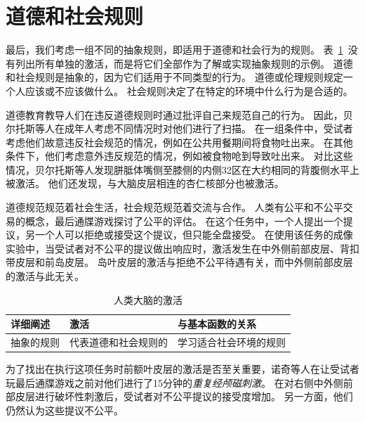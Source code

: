 \section{道德和社会规则}

最后，我们考虑一组不同的抽象规则，即适用于道德和社会行为的规则。
表~\ref{tab:9_9}~没有列出所有单独的激活，而是将它们全部作为了解或实现抽象规则的示例。
道德和社会规则是抽象的，因为它们适用于不同类型的行为。
道德或伦理规则规定一个人应该或不应该做什么。
社会规则决定了在特定的环境中什么行为是合适的。


道德教育教导人们在违反道德规则时通过批评自己来规范自己的行为\cite{locke1997self}。
因此，贝尔托斯等人\cite{berthoz2006affective}在成年人考虑不同情况时对他们进行了扫描。
在一组条件中，受试者考虑他们故意违反社会规范的情况，例如在公共用餐期间将食物吐出来。
在其他条件下，他们考虑意外违反规范的情况，例如被食物呛到导致吐出来。
对比这些情况，贝尔托斯等人发现胼胝体嘴侧至膝侧的内侧32区在大约相同的背腹侧水平上被激活。
他们还发现，与大脑皮层相连的杏仁核部分也被激活\cite{beckmann2009connectivity}。


道德规范规范着社会生活，社会规范规范着交流与合作。
人类有公平和不公平交易的概念，最后通牒游戏探讨了公平的评估。
在这个任务中，一个人提出一个提议，另一个人可以拒绝或接受这个提议，但只能全盘接受。
在使用该任务的成像实验中，当受试者对不公平的提议做出响应时，激活发生在中外侧前部皮层、背扣带皮层和前岛皮层\cite{sanfey2003neural}。
岛叶皮层的激活与拒绝不公平待遇有关，而中外侧前部皮层的激活与此无关。


\begin{table}[htbp] 
	\newcommand{\tabincell}[2]{\begin{tabular}{@{}#1@{}}#2\end{tabular}} %
	\centering
	\caption{人类大脑的激活\label{tab:9_9}}
	\renewcommand\arraystretch{1.5}	%
	\begin{tabular}{lll}
		\toprule
		详细阐述 & 激活 & 与基本函数的关系\\
		\midrule
		抽象的规则 & 代表道德和社会规则的 & 学习适合社会环境的规则  \\
		
		\bottomrule
		
	\end{tabular}%
\end{table}%


为了找出在执行这项任务时前额叶皮层的激活是否至关重要，诺奇等人\cite{knoch2006diminishing}在让受试者玩最后通牒游戏之前对他们进行了15分钟的\textit{重复经颅磁刺激}。
在对右侧中外侧前部皮层进行破坏性刺激后，受试者对不公平提议的接受度增加。
另一方面，他们仍然认为这些提议不公平。


